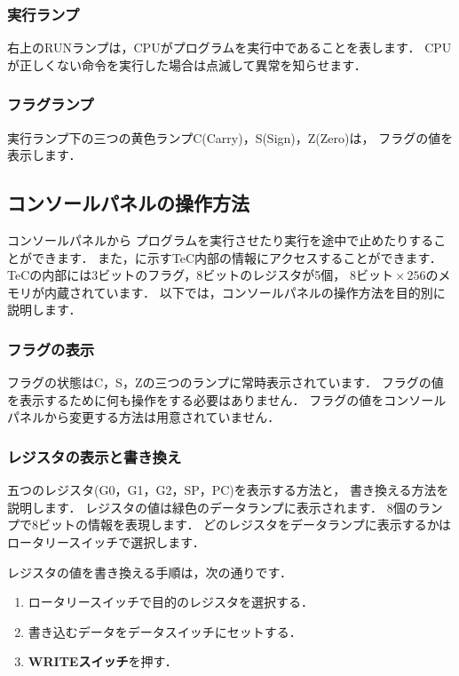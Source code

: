 \subsubsection{実行ランプ}
右上のRUNランプは，CPUがプログラムを実行中であることを表します．
CPUが正しくない命令を実行した場合は点滅して異常を知らせます．

\subsubsection{フラグランプ}
実行ランプ下の三つの黄色ランプC(Carry)，S(Sign)，Z(Zero)は，
フラグの値を表示します．

\subsection{コンソールパネルの操作方法}
\label{operation}
コンソールパネルから
プログラムを実行させたり実行を途中で止めたりすることができます．
また，に示すTeC内部の情報にアクセスすることができます．
TeCの内部には3ビットのフラグ，8ビットのレジスタが5個，
$8ビット \times 256$のメモリが内蔵されています．
以下では，コンソールパネルの操作方法を目的別に説明します．


\subsubsection{フラグの表示}
フラグの状態はC，S，Zの三つのランプに常時表示されています．
フラグの値を表示するために何も操作をする必要はありません．
フラグの値をコンソールパネルから変更する方法は用意されていません．

\subsubsection{レジスタの表示と書き換え}
五つのレジスタ(G0，G1，G2，SP，PC)を表示する方法と，
書き換える方法を説明します．
レジスタの値は緑色のデータランプに表示されます．
8個のランプで8ビットの情報を表現します．
どのレジスタをデータランプに表示するかは
ロータリースイッチで選択します．
\vspace{0.3cm}

レジスタの値を書き換える手順は，次の通りです．
\begin{enumerate}
\item ロータリースイッチで目的のレジスタを選択する．
\item 書き込むデータをデータスイッチにセットする．
\item {\bf WRITEスイッチ}を押す．
\end{enumerate}


